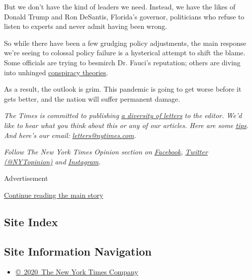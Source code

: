 But we don't have the kind of leaders we need. Instead, we have the
likes of Donald Trump and Ron DeSantis, Florida's governor, politicians
who refuse to listen to experts and never admit having been wrong.

So while there have been a few grudging policy adjustments, the main
response we're seeing to colossal policy failure is a hysterical attempt
to shift the blame. Some officials are trying to besmirch Dr. Fauci's
reputation; others are diving into unhinged
\href{https://twitter.com/joshtpm/status/1282343525103939586}{conspiracy
theories}.

As a result, the outlook is grim. This pandemic is going to get worse
before it gets better, and the nation will suffer permanent damage.

\emph{The Times is committed to publishing}
\href{https://www.nytimes.com/2019/01/31/opinion/letters/letters-to-editor-new-york-times-women.html}{\emph{a
diversity of letters}} \emph{to the editor. We'd like to hear what you
think about this or any of our articles. Here are some}
\href{https://help.nytimes.com/hc/en-us/articles/115014925288-How-to-submit-a-letter-to-the-editor}{\emph{tips}}\emph{.
And here's our email:}
\href{mailto:letters@nytimes.com}{\emph{letters@nytimes.com}}\emph{.}

\emph{Follow The New York Times Opinion section on}
\href{https://www.facebook.com/nytopinion}{\emph{Facebook}}\emph{,}
\href{http://twitter.com/NYTOpinion}{\emph{Twitter (@NYTopinion)}}
\emph{and}
\href{https://www.instagram.com/nytopinion/}{\emph{Instagram}}\emph{.}

Advertisement

\protect\hyperlink{after-bottom}{Continue reading the main story}

\hypertarget{site-index}{%
\subsection{Site Index}\label{site-index}}

\hypertarget{site-information-navigation}{%
\subsection{Site Information
Navigation}\label{site-information-navigation}}

\begin{itemize}
\tightlist
\item
  \href{https://help.nytimes.com/hc/en-us/articles/115014792127-Copyright-notice}{©~2020~The
  New York Times Company}
\end{itemize}

